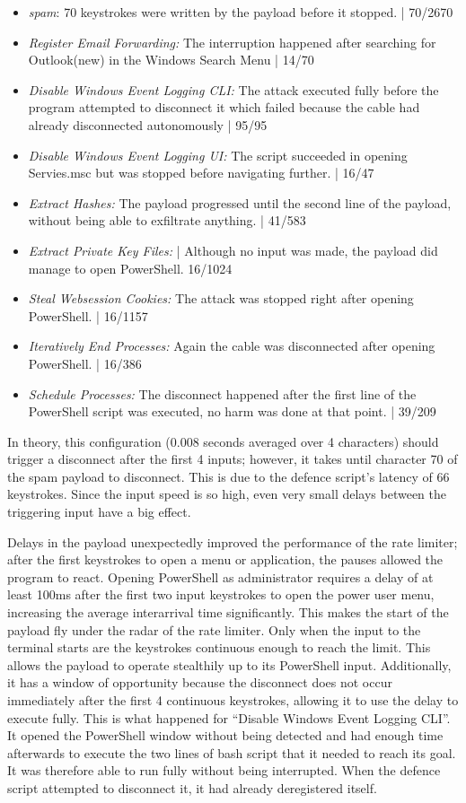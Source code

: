 \begin{itemize}
    \item  \emph{spam}: 70 keystrokes were written by the payload before it stopped. | 70/2670
    \item  \emph{Register Email Forwarding:} The interruption happened after searching for Outlook(new) in the Windows Search Menu  | 14/70 
    \item  \emph{Disable Windows Event Logging CLI:}  The attack executed fully before the program attempted to disconnect it which failed because the cable had already disconnected autonomously | 95/95
    \item  \emph{Disable Windows Event Logging UI:} The script succeeded in opening Servies.msc but was stopped before navigating further. | 16/47
    \item  \emph{Extract Hashes:}  The payload progressed until the second line of the payload, without being able to exfiltrate anything. | 41/583
    \item  \emph{Extract Private Key Files:}  | Although no input was made, the payload did manage to open PowerShell. 16/1024
    \item  \emph{Steal Websession Cookies:} The attack was stopped right after opening PowerShell. | 16/1157
    \item  \emph{Iteratively End Processes:} Again the cable was disconnected after opening PowerShell. | 16/386
    \item  \emph{Schedule Processes:} The disconnect happened after the first line of the PowerShell script was executed, no harm was done at that point. | 39/209
\end{itemize}

In theory, this configuration (0.008 seconds averaged over 4 characters) should trigger a disconnect after the first 4 inputs; however, it takes until character 70 of the spam payload to disconnect. This is due to the defence script's latency of 66 keystrokes. Since the input speed is so high, even very small delays between the triggering input have a big effect.


Delays in the payload unexpectedly improved the performance of the rate limiter; after the first keystrokes to open a menu or application, the pauses allowed the program to react. Opening PowerShell as administrator requires a delay of at least 100ms after the first two input keystrokes to open the power user menu, increasing the average interarrival time significantly. This makes the start of the payload fly under the radar of the rate limiter. Only when the input to the terminal starts are the keystrokes continuous enough to reach the limit. This allows the payload to operate stealthily up to its PowerShell input. Additionally, it has a window of opportunity because the disconnect does not occur immediately after the first 4 continuous keystrokes, allowing it to use the delay to execute fully. This is what happened for ``Disable Windows Event Logging CLI''. It opened the PowerShell window without being detected and had enough time afterwards to execute the two lines of bash script that it needed to reach its goal. It was therefore able to run fully without being interrupted. When the defence script attempted to disconnect it, it had already deregistered itself. 

